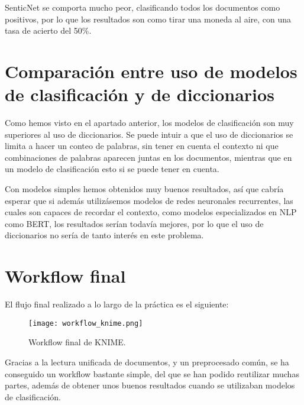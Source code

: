 SenticNet se comporta mucho peor, clasificando todos los documentos como positivos, por lo que los resultados son como tirar una moneda al aire, con una tasa de acierto del 50\%.

\section{Comparación entre uso de modelos de clasificación y de diccionarios}

Como hemos visto en el apartado anterior, los modelos de clasificación son muy superiores al uso de diccionarios. Se puede intuir a que el uso de diccionarios se limita a hacer un conteo de palabras, sin tener en cuenta el contexto ni que combinaciones de palabras aparecen juntas en los documentos, mientras que en un modelo de clasificación esto si se puede tener en cuenta.

Con modelos simples hemos obtenidos muy buenos resultados, así que cabría esperar que si además utilizásemos modelos de redes neuronales recurrentes, las cuales son capaces de recordar el contexto, como modelos especializados en NLP como BERT, los resultados serían todavía mejores, por lo que el uso de diccionarios no sería de tanto interés en este problema.

\section{Workflow final}


El flujo final realizado a lo largo de la práctica es el siguiente:

\begin{figure}[H]
	\centering
	\texttt{[image: workflow\_knime.png]}
	\caption{Workflow final de KNIME.}
	\label{fig:workflow_knime}
\end{figure}


Gracias a la lectura unificada de documentos, y un preprocesado común, se ha conseguido un workflow bastante simple, del que se han podido reutilizar muchas partes, además de obtener unos buenos resultados cuando se utilizaban modelos de clasificación.
